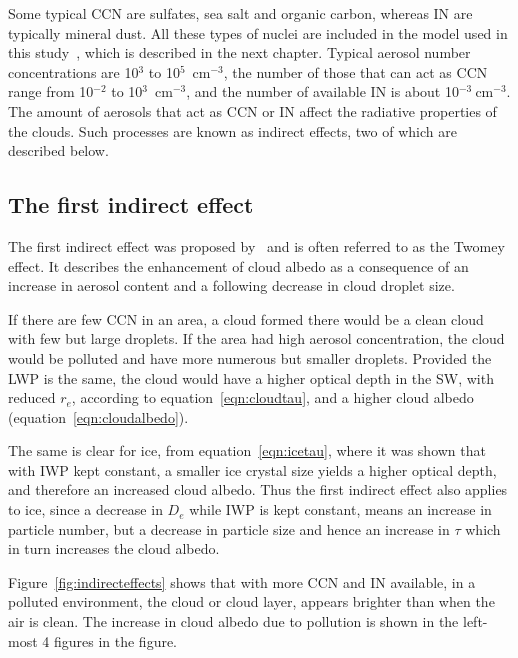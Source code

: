 Some typical CCN are sulfates, sea salt and organic carbon, whereas IN are typically mineral dust. All these types of nuclei are included in the model used in this study~\citep{Thompson2014}, which is described in the next chapter. Typical aerosol number concentrations are 10$^3$ to 10$^5$~$\text{cm}^{-3}$, the number of those that can act as CCN range from 10$^{-2}$ to 10$^3$~$\text{cm}^{-3}$, and the number of available IN is about 10$^{-3}~\text{cm}^{-3}$. The amount of aerosols that act as CCN or IN affect the radiative properties of the clouds. Such processes are known as indirect effects, two of which are described below.
 
\subsection{The first indirect effect}
The first indirect effect was proposed by~\citet{Twomey1974} and is often referred to as the Twomey effect. It describes the enhancement of cloud albedo as a consequence of an increase in aerosol content and a following decrease in cloud droplet size.

If there are few CCN in an area, a cloud formed there would be a clean cloud with few but large droplets. If the area had high aerosol concentration, the cloud would be polluted and have more numerous but smaller droplets. Provided the LWP is the same, the cloud would have a higher optical depth in the SW, with reduced $r_e$, according to equation~\ref{eqn:cloudtau}, and a higher cloud albedo (equation~\ref{eqn:cloudalbedo}).

The same is clear for ice, from equation~\ref{eqn:icetau}, where it was shown that with IWP kept constant, a smaller ice crystal size yields a higher optical depth, and therefore an increased cloud albedo. Thus the first indirect effect also applies to ice, since a decrease in $D_e$ while IWP is kept constant, means an increase in particle number, but a decrease in particle size and hence an increase in $\tau$ which in turn increases the cloud albedo.

Figure~\ref{fig:indirecteffects} shows that with more CCN and IN available, in a polluted environment, the cloud or cloud layer, appears brighter than when the air is clean. The increase in cloud albedo due to pollution is shown in the left-most 4 figures in the figure. 

